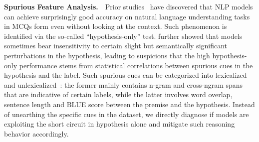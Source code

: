 \textbf{Spurious Feature Analysis.}~~Prior studies~\cite{endingonly1,zellers2018swag,izmailov2022feature} 
have discovered that NLP models can achieve surprisingly 
good accuracy on natural language understanding tasks in MCQs form even without looking at the context. 
Such phenomenon is identified via the so-called ``hypothesis-only'' test. \cite{sanchez2018behavior} 
further showed that models sometimes bear insensitivity to 
certain slight but semantically significant perturbations in the hypothesis, 
leading to suspicions that the high hypothesis-only performance 
stems from statistical correlations between spurious cues in the 
hypothesis and the label. Such spurious cues can be categorized 
into lexicalized~\cite{naik2018stress} and unlexicalized~\cite{bowman2015large,joshi2022all}: the former mainly contains n-gram and cross-ngram spans that are indicative of certain labels, while the latter involves word overlap, sentence length and BLUE score between the premise and the hypothesis. Instead of unearthing the specific cues in the dataset, we directly diagnose if models are exploiting the short circuit in hypothesis alone 
and mitigate such reasoning behavior accordingly.


